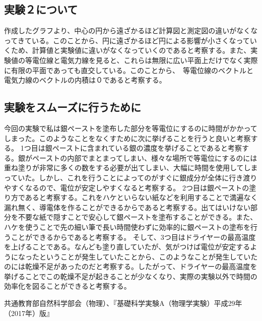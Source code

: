 \documentclass{jsarticle}
\begin{document}
\subsection{実験２について}
作成したグラフより、中心の円から遠ざかるほど計算図と測定図の違いがなくなってきている。このことから、円に遠ざかるほど円による影響が小さくなっていくため、計算値と実験値に違いがなくなっていくのであると考察する。また、実験値の等電位線と電気力線を見ると、これらは無限に広い平面上だけでなく実際に有限の平面であっても直交している。このことから、　等電位線のベクトルと電気力線のベクトルの内積は０であると考察する。

\subsection{実験をスムーズに行うために}
今回の実験で私は銀ペーストを塗布した部分を等電位にするのに時間がかかってしまった。このようなことをなくすために次に挙げることを行うと良いと考察する。
1つ目は銀ペーストに含まれている銀の濃度を挙げることであると考察する。銀がペーストの内部でまとまってしまい、様々な場所で等電位にするのには重ね塗りが非常に多くの数をする必要が出てしまい、大幅に時間を使用してしまっていた。しかし、これを行うことによってのがすぐに銀成分が全体に行き渡りやすくなるので、電位が安定しやすくなると考察する。
2つ目は銀ペーストの塗り方であると考察する。これをハケといらない紙などを利用することで満遍なく漏れ無く、導電体を作ることができるからであると考察する。出てはいけない部分を不要な紙で隠すことで安心して銀ペーストを塗布することができる。また、ハケを使うことで先の細い筆で長い時間使わずに効率的に銀ペーストの塗布を行うことができるからであると考察する。
そして、3つ目はドライヤーの最高温度を上げることである。なんども塗り直していたが、気がつけば電位が安定するようになったということが発生していたことから、このようなことが発生していたのには乾燥不足があったのだと考察する。したがって、ドライヤーの最高温度を挙げることでこの乾燥不足が起きることが少なくなり、実際の実験以外で時間の効率化を図ることができると考察する。

\begin{thebibliography}{99}
	 共通教育部自然科学部会（物理）、『基礎科学実験A（物理学実験）平成29年（2017年）版』
\end{thebibliography}
\end{document}
